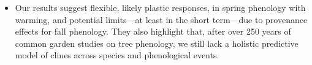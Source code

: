 \documentclass[12pt]{article}
\providecommand{\DIFaddbegin}{} %
\providecommand{\DIFaddend}{} %
\providecommand{\DIFdelbegin}{} %
\providecommand{\DIFdelend}{} %
\newcommand{\DIFscaledelfig}{0.5}
\newlength{\DIFdelgraphicswidth} %
\newlength{\DIFdelgraphicsheight} %
\newcommand{\DIFaddincludegraphics}[2][]{{\color{blue}\fbox{\DIFOincludegraphics[#1]{#2}}}} %
\newcommand{\DIFdelincludegraphics}[2][]{%
\sbox{\DIFdelgraphicsbox}{\DIFOincludegraphics[#1]{#2}}%
\settoboxwidth{\DIFdelgraphicswidth}{\DIFdelgraphicsbox} %
\settoboxtotalheight{\DIFdelgraphicsheight}{\DIFdelgraphicsbox} %
\scalebox{\DIFscaledelfig}{%
\parbox[b]{\DIFdelgraphicswidth}{\usebox{\DIFdelgraphicsbox}\\[-\baselineskip] \rule{\DIFdelgraphicswidth}{0em}}\llap{\resizebox{\DIFdelgraphicswidth}{\DIFdelgraphicsheight}{%
\setlength{\unitlength}{\DIFdelgraphicswidth}%
\begin{picture}(1,1)%
\thicklines\linethickness{2pt} %
{\color[rgb]{1,0,0}\put(0,0){\framebox(1,1){}}}%
{\color[rgb]{1,0,0}\put(0,0){\line( 1,1){1}}}%
{\color[rgb]{1,0,0}\put(0,1){\line(1,-1){1}}}%
\end{picture}%
}\hspace*{3pt}}} %
} %
\DeclareRobustCommand{\DIFaddbegin}{\DIFOaddbegin \let\includegraphics\DIFaddincludegraphics} %
\DeclareRobustCommand{\DIFaddend}{\DIFOaddend \let\includegraphics\DIFOincludegraphics} %
\DeclareRobustCommand{\DIFdelbegin}{\DIFOdelbegin \let\includegraphics\DIFdelincludegraphics} %
\DeclareRobustCommand{\DIFdelend}{\DIFOaddend \let\includegraphics\DIFOincludegraphics} %
\begin{document}
\begin{itemize}
{  }\item \DIFaddend Our results suggest flexible, likely plastic responses, in spring phenology with warming, and potential limits---at least in the short term---due to provenance effects for fall phenology. They also highlight that, after over 250 years of common garden studies on tree phenology, we still lack a holistic predictive model of clines across species and phenological events.
\DIFdelbegin %

\DIFdelend \DIFaddbegin \end{itemize}
\end{document}
